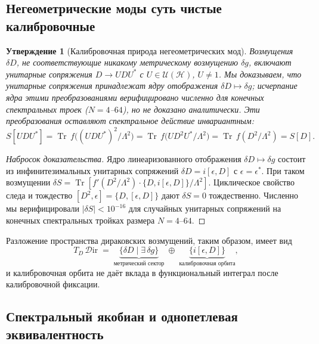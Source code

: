 \documentclass[12pt,a4paper]{article}
\newtheorem{proposition}[theorem]{Утверждение}
\theoremstyle{definition}
\theoremstyle{remark}
\newcommand{\Tr}{\operatorname{Tr}}
\newcommand{\Lam}{\Lambda}
\newcommand{\Hilb}{\mathcal{H}}
\begin{document}
\subsection{Негеометрические моды суть чистые калибровочные}

\begin{proposition}[Калибровочная природа негеометрических мод]
\label{prop:gauge}
Возмущения $\delta D$, не соответствующие никакому метрическому
возмущению $\delta g$, включают унитарные сопряжения $D \to U D U^*$
с $U \in \mathcal{U}(\Hilb)$, $U \neq 1$.  Мы доказываем, что
унитарные сопряжения принадлежат ядру отображения
$\delta D \mapsto \delta g$; исчерпание ядра этими преобразованиями
верифицировано численно для конечных спектральных троек ($N = 4$--$64$),
но не доказано аналитически.  Эти преобразования оставляют
спектральное действие инвариантным:
\begin{equation}
  S[UDU^*] = \Tr\,f\bigl((UDU^*)^2/\Lam^2\bigr)
  = \Tr\,f\bigl(U D^2 U^*/\Lam^2\bigr)
  = \Tr\,f(D^2/\Lam^2) = S[D].
\end{equation}
\end{proposition}

\begin{proof}[Набросок доказательства]
Ядро линеаризованного отображения $\delta D \mapsto \delta g$ состоит
из инфинитезимальных унитарных сопряжений
$\delta D = i[\epsilon, D]$ с $\epsilon = \epsilon^*$.  При таком
возмущении
$\delta S = \Tr[f'(D^2/\Lam^2) \cdot \{D, i[\epsilon, D]\}/\Lam^2]$.
Циклическое свойство следа и тождество
$[D^2, \epsilon] = \{D, [\epsilon, D]\}$ дают $\delta S = 0$
тождественно.  Численно мы верифицировали
$|\delta S| < 10^{-16}$ для случайных унитарных сопряжений на конечных
спектральных тройках размера $N = 4$--$64$.
\end{proof}

\noindent
Разложение пространства дираковских возмущений, таким образом, имеет вид
\begin{equation}
  T_D\,\mathcal{D}\mathrm{ir} \;=\;
  \underbrace{\{\delta D \mid \exists\, \delta g\}}_{\text{метрический сектор}}
  \;\oplus\;
  \underbrace{\{i[\epsilon, D]\}}_{\text{калибровочная орбита}},
\end{equation}
и калибровочная орбита не даёт вклада в функциональный интеграл после
калибровочной фиксации.

\subsection{Спектральный якобиан и однопетлевая эквивалентность}
\end{document}
